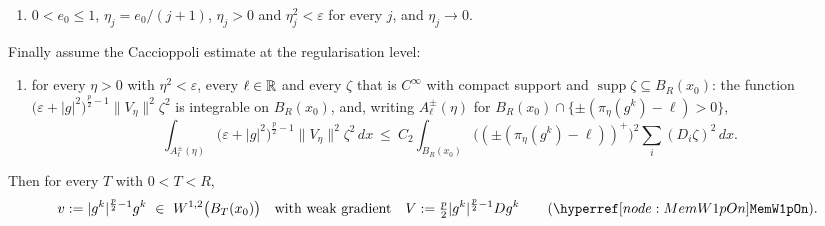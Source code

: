 \begin{helper}
\begin{enumerate}
\item[(H11)] $0<e_0\le1$, $\eta_j=e_0/(j+1)$, $\eta_j>0$ and
  $\eta_j^2<\varepsilon$ for every $j$, and $\eta_j\to0$.
\end{enumerate}
Finally assume the Caccioppoli estimate at the regularisation level:
\begin{enumerate}
\item[(H12)] for every $\eta>0$ with $\eta^2<\varepsilon$, every $\ell\in\mathbb{R}$ and
  every $\zeta$ that is $C^\infty$ with compact support and
  $\operatorname{supp}\zeta\subseteq B_R(x_0)$: the function
  $\bigl(\varepsilon+|g|^2\bigr)^{\frac p2-1}\|V_\eta\|^2\zeta^2$ is integrable
  on $B_R(x_0)$, and, writing
  $A^{\pm}_\ell(\eta)$ for $B_R(x_0)\cap\{\pm(\pi_\eta(g^k)-\ell)>0\}$,
  \[
  \int_{A^{\pm}_\ell(\eta)}
  \bigl(\varepsilon+|g|^2\bigr)^{\frac p2-1}\|V_\eta\|^2\zeta^2\,dx
  \ \le\ C_2\int_{B_R(x_0)}
  \bigl((\pm(\pi_\eta(g^k)-\ell))^{+}\bigr)^2\sum_i(D_i\zeta)^2\,dx .
  \]
\end{enumerate}
Then for every $T$ with $0<T<R$,
\[
v:=|g^k|^{\frac p2-1}g^k\ \in\ W^{1,2}\bigl(B_T(x_0)\bigr)
\quad\text{with weak gradient}\quad
V:=\tfrac p2|g^k|^{\frac p2-1}Dg^k
\qquad(\noderef{MemW1pOn}).
\]
\end{helper}
